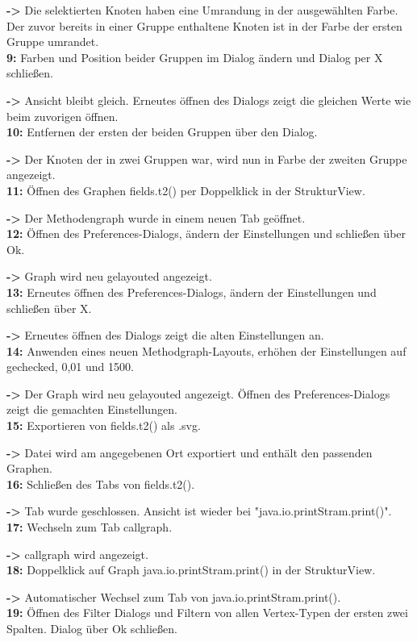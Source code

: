 \textbf{->} Die selektierten Knoten haben eine Umrandung in der ausgewählten Farbe. Der zuvor bereits in einer Gruppe enthaltene Knoten ist in der Farbe der ersten Gruppe umrandet.\\
\textbf{9:} Farben und Position beider Gruppen im Dialog ändern und Dialog per X schließen.

\textbf{->} Ansicht bleibt gleich. Erneutes öffnen des Dialogs zeigt die gleichen Werte wie beim zuvorigen öffnen.\\
\textbf{10:} Entfernen der ersten der beiden Gruppen über den Dialog.

\textbf{->} Der Knoten der in zwei Gruppen war, wird nun in Farbe der zweiten Gruppe angezeigt.\\
\textbf{11:} Öffnen des Graphen fields.t2() per Doppelklick in der StrukturView.

\textbf{->} Der Methodengraph wurde in einem neuen Tab geöffnet.\\
\textbf{12:} Öffnen des Preferences-Dialogs, ändern der Einstellungen und schließen über Ok.

\textbf{->} Graph wird neu gelayouted angezeigt.\\
\textbf{13:} Erneutes öffnen des Preferences-Dialogs, ändern der Einstellungen und schließen über X.

\textbf{->} Erneutes öffnen des Dialogs zeigt die alten Einstellungen an.\\
\textbf{14:} Anwenden eines neuen Methodgraph-Layouts, erhöhen der Einstellungen auf gechecked, 0,01 und 1500.

\textbf{->} Der Graph wird neu gelayouted angezeigt. Öffnen des Preferences-Dialogs zeigt die gemachten Einstellungen.\\
\textbf{15:} Exportieren von fields.t2() als .svg.

\textbf{->} Datei wird am angegebenen Ort exportiert und enthält den passenden Graphen.\\
\textbf{16:} Schließen des Tabs von fields.t2().

\textbf{->} Tab wurde geschlossen. Ansicht ist wieder bei "java.io.printStram.print()".\\
\textbf{17:} Wechseln zum Tab callgraph.

\textbf{->} callgraph wird angezeigt.\\
\textbf{18:} Doppelklick auf Graph java.io.printStram.print() in der StrukturView.

\textbf{->} Automatischer Wechsel zum Tab von java.io.printStram.print().\\
\textbf{19:} Öffnen des Filter Dialogs und Filtern von allen Vertex-Typen der ersten zwei Spalten. Dialog über Ok schließen.

